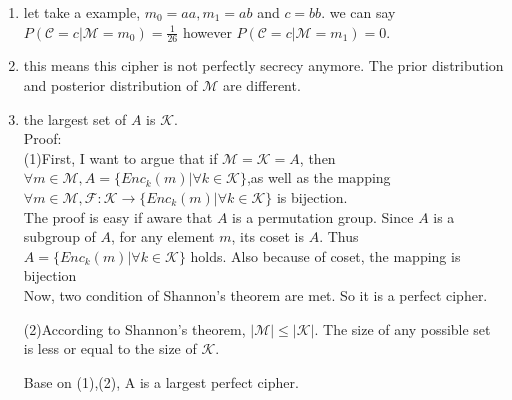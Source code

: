 \normalfont\documentclass[letterpaper,11pt]{article}
\begin{document}
\begin{enumerate}
\begin{enumerate}
		\item let take a example, $m_0=aa, m_1 = ab$ and $c = bb$. we can say $P(\mathcal{C}=c|\mathcal{M}=m_0) = \frac{1}{26}$ however $P(\mathcal{C}=c|\mathcal{M}=m_1) = 0$.
		\item this means this cipher is not perfectly secrecy anymore. The prior distribution and posterior distribution of $\mathcal{M}$ are different.
		\item the largest set of $A$ is $\mathcal{K}$.\\
		Proof:\\
		(1)First, I want to argue that if $\mathcal{M}=\mathcal{K} = A$, then $\forall{m \in \mathcal{M}}, A = \{Enc_k(m)|\forall k \in \mathcal{K}\}$,as well as the mapping $\forall{m \in \mathcal{M}}, \mathcal{F}: \mathcal{K} \to \{Enc_k(m)|\forall k \in \mathcal{K}\}$ is bijection.\\
		The proof is easy if aware that $A$ is a permutation group. Since $A$ is a subgroup of $A$, for any 	element $m$, its coset is $A$. Thus $A = \{Enc_k(m)|\forall k \in \mathcal{K}\}$ holds. Also because of coset, the mapping is bijection \\
		Now, two condition of Shannon's theorem are met. So it is a perfect cipher.\par
		(2)According to Shannon's theorem, $|\mathcal{M}| \leq |\mathcal{K}|$. The size of any possible set is less or equal to the size of $\mathcal{K}$.\par
		Base on (1),(2), A is a largest perfect cipher. 
	\end{enumerate}


\end{enumerate}
\end{document}

